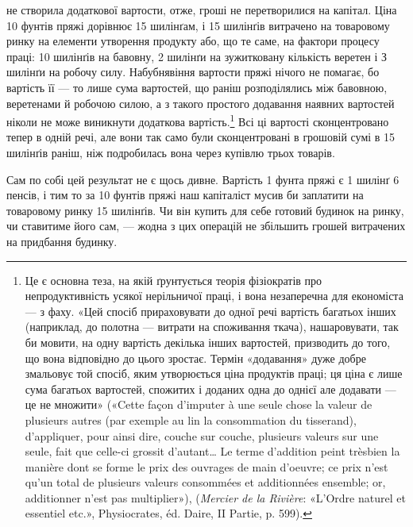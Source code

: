 \parcont{}  %
не створила додаткової вартости, отже, гроші не перетворилися
на капітал. Ціна 10 фунтів пряжі дорівнює 15 шилінґам, і 15 шилінґів
витрачено на товаровому ринку на елементи утворення
продукту або, що те саме, на фактори процесу праці: 10 шилінґів
на бавовну, 2 шилінґи на зужитковану кількість веретен і
З шилінґи на робочу силу. Набубнявіння вартости пряжі нічого
не помагає, бо вартість її — то лише сума вартостей, що раніш
розподілялись між бавовною, веретенами й робочою силою, а з
такого простого додавання наявних вартостей ніколи не може
виникнути додаткова вартість.\footnote{
Це є основна теза, на якій ґрунтується теорія фізіократів про
непродуктивність усякої нерільничої праці, і вона незаперечна для економіста
— з фаху. «Цей спосіб прираховувати до одної речі вартість багатьох
інших (наприклад, до полотна — витрати на споживання ткача), нашаровувати,
так би мовити, на одну вартість декілька інших вартостей, призводить
до того, що вона відповідно до цього зростає. Термін «додавання» дуже
добре змальовує той спосіб, яким утворюється ціна продуктів праці; ця
ціна є лише сума багатьох вартостей, спожитих і доданих одна до однієї
але додавати — це не множити» («Cette façon d’imputer à une seule chose
la valeur de plusieurs autres (par exemple au lin la consommation du tisserand),
d’appliquer, pour ainsi dire, couche sur couche, plusieurs valeurs
sur une seule, fait que celle-ci grossit d’autant\dots{} Le terme d’addition peint trèsbien
la manière dont se forme le prix des ouvrages de main d’oeuvre; ce prix
n’est qu’un total de plusieurs valeurs consommées et additionnées ensemble;
or, additionner n’est pas multiplier»), (\emph{Mercier de la Rivière}: «L’Ordre naturel
et essentiel etc.», Physiocrates, éd. Daire, II Partie, p. 599).
} Всі ці вартості сконцентровано
тепер в одній речі, але вони так само були сконцентровані в грошовій
сумі в 15 шилінґів раніш, ніж подробилась вона через
купівлю трьох товарів.

Сам по собі цей результат не є щось дивне. Вартість 1 фунта
пряжі є 1 шилінґ 6 пенсів, і тим то за 10 фунтів пряжі наш капіталіст
мусив би заплатити на товаровому ринку 15 шилінґів.
Чи він купить для себе готовий будинок на ринку, чи ставитиме
його сам, — жодна з цих операцій не збільшить грошей витрачених
на придбання будинку.

